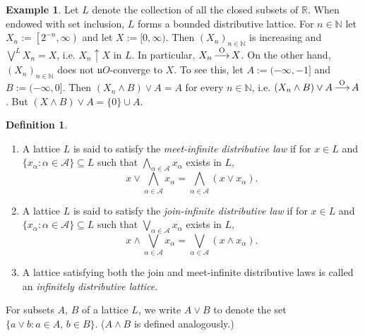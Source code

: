 \documentclass[12pt,a4paper]{amsart}
\numberwithin{equation}{section}
\theoremstyle{definition}
\newtheorem{defn}{Definition}
\newtheorem{exmp}[thm]{Example}
\newcommand{\converges}[1]{\mathop{\overset{\text{#1}}{\longrightarrow}}}
\newcommand{\N}{\mathds N}
\newcommand{\R}{\mathds R}
\newcommand{\lbigvee}[1]{\bigvee^{\scriptscriptstyle #1}}
\begin{document}
 

\begin{exmp}
Let $L$ denote the collection of all the closed subsets of $\R$.  When endowed with set inclusion, $L$ forms a bounded distributive lattice. For $n\in\N$ let $X_n:=\left[{2^{-n}},\infty\right)$ and let $X:=[0,\infty)$. Then $(X_n)_{n\in\N}$ is increasing and $\lbigvee{L}X_n=X$, i.e. $X_n\uparrow X$ in $L$. In particular, $X_n\converges{\text{O}} X$.   On the  other hand, $(X_n)_{n\in\N}$ does not $\mathfrak{u}O$-converge to $X$.  To see this, let $A:=(-\infty,-1]$ and $B:=(-\infty,0]$.  Then  $(X_n\wedge B)\vee A=A$ for every $n\in\N$, i.e. $(X_n\wedge B)\vee A\converges{\text{O}} A$.  But $(X\wedge B)\vee A=\{0\}\cup A$.
\end{exmp}




\begin{defn}
\begin{enumerate}[{\rm(i)}]
    \item A lattice $L$ is said to satisfy the \textit{meet-infinite distributive law} if for $x\in L$ and $\{x_{\alpha} : \alpha \in \mathcal{A}\} \subseteq L$ such that $\bigwedge_{\alpha  \in \mathcal{A}} x_{\alpha}$ exists in $L$, 
	\begin{equation*}
		x \vee \bigwedge _{\alpha  \in \mathcal{A}} x_{\alpha} = \bigwedge_{\alpha \in \mathcal{A}} (x \vee x_{\alpha}).
	\end{equation*}
 
 \item A lattice $L$ is said to satisfy the \textit{join-infinite distributive law} if for $x \in L$ and $\{x_{\alpha} : \alpha \in \mathcal{A}\}\subseteq L$ such that $\bigvee_{\alpha  \in \mathcal{A}} x_{\alpha}$ exists in $L$,
	\begin{equation*}
		x \wedge \bigvee_{\alpha  \in \mathcal{A}} x_{\alpha} = \bigvee_{\alpha \in \mathcal{A}} (x \wedge x_{\alpha}).
	\end{equation*}

 \item  A lattice satisfying both the join and meet-infinite distributive laws is called an \textit{infinitely distributive lattice}.
\end{enumerate}
	\end{defn}

For subsets $A$, $B$ of a lattice $L$, we write $A\vee B$ to denote the set $\{a\vee b:a\in A,\,b\in B\}$.  ($A\wedge B$ is defined analogously.)
\end{document}

